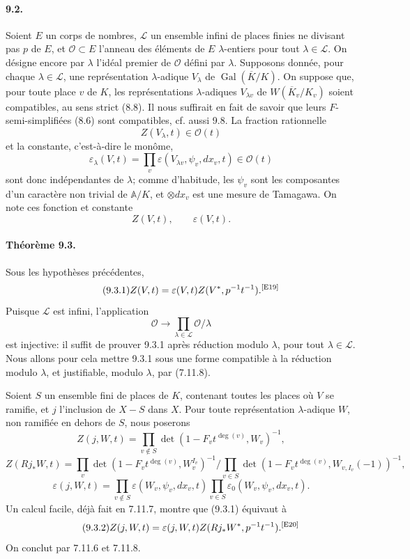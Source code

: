 \documentclass[10pt,letterpaper]{article}
\newcommand{\Gal}{\operatorname{Gal}}
\providecommand{\Gal}{\operatorname{Gal}}
\providecommand{\LLL}{\mathcal L}
\providecommand{\Gal}{\operatorname{Gal}}
\providecommand{\Gal}{\operatorname{Gal}}
\providecommand{\Gal}{\operatorname{Gal}}
\newcommand{\auditmark}[1]{\textsuperscript{\normalfont\scriptsize[E#1]}}
\begin{document}
\paragraph{9.2.} Soient $E$ un corps de nombres, $\LLL$ un ensemble infini de places finies ne divisant pas $p$ de $E$, et $\mathcal O\subset E$ l'anneau des éléments de $E$ $\lambda$-entiers pour tout $\lambda\in\LLL$. On désigne encore par $\lambda$ l'idéal premier de $\mathcal O$ défini par $\lambda$. Supposons donnée, pour chaque $\lambda\in\LLL$, une représentation $\lambda$-adique $V_\lambda$ de $\Gal(\overline K/K)$. On suppose que, pour toute place $v$ de $K$, les représentations $\lambda$-adiques $V_{\lambda v}$ de $W(\overline K_v/K_v)$ soient compatibles, au sens strict (8.8). Il nous suffirait en fait de savoir que leurs $F$-semi-simplifiées (8.6) sont compatibles, cf. aussi 9.8. La fraction rationnelle
\[
Z(V_\lambda,t)\in\mathcal O(t)
\]
et la constante, c'est-à-dire le monôme,
\[
\varepsilon_\lambda(V,t)=\prod_v\varepsilon(V_{\lambda v},\psi_v,dx_v,t)\in\mathcal O(t)
\]
sont donc indépendantes de $\lambda$; comme d'habitude, les $\psi_v$ sont les composantes d'un caractère non trivial de $\mathbb A/K$, et $\otimes dx_v$ est une mesure de Tamagawa. On note ces fonction et constante
\[
Z(V,t),\qquad \varepsilon(V,t).
\]

\paragraph{Théorème 9.3.} Sous les hypothèses précédentes,
\[
\tag{9.3.1}
Z(V,t)=\varepsilon(V,t)Z(V^*,p^{-1}t^{-1}).\auditmark{19}
\]
Puisque $\LLL$ est infini, l'application
\[
\mathcal O\longrightarrow\prod_{\lambda\in\LLL}\mathcal O/\lambda
\]
est injective: il suffit de prouver 9.3.1 après réduction modulo $\lambda$, pour tout $\lambda\in\LLL$. Nous allons pour cela mettre 9.3.1 sous une forme compatible à la réduction modulo $\lambda$, et justifiable, modulo $\lambda$, par (7.11.8).

Soient $S$ un ensemble fini de places de $K$, contenant toutes les places où $V$ se ramifie, et $j$ l'inclusion de $X-S$ dans $X$. Pour toute représentation $\lambda$-adique $W$, non ramifiée en dehors de $S$, nous poserons
\[
Z(j,W,t)=\prod_{v\notin S}\det(1-F_vt^{\deg(v)},W_v)^{-1},
\]
\[
Z(Rj_*W,t)=
\prod_v\det(1-F_vt^{\deg(v)},W_v^{I_v})^{-1}
\Big/
\prod_{v\in S}\det(1-F_vt^{\deg(v)},W_{v,I_v}(-1))^{-1},
\]
\[
\varepsilon(j,W,t)=
\prod_{v\notin S}\varepsilon(W_v,\psi_v,dx_v,t)
\prod_{v\in S}\varepsilon_0(W_v,
\psi_v,dx_v,t).
\]
Un calcul facile, déjà fait en 7.11.7, montre que (9.3.1) équivaut à
\[
\tag{9.3.2}
Z(j,W,t)=\varepsilon(j,W,t)Z(Rj_*W^*,p^{-1}t^{-1}).\auditmark{20}
\]
On conclut par 7.11.6 et 7.11.8.
\end{document}
